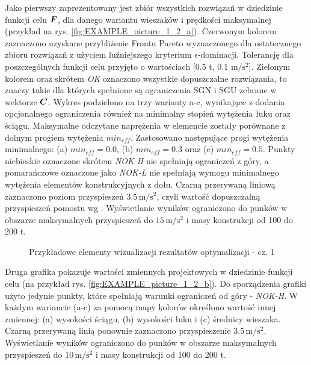 Jako pierwszy zaprezentowany jest zbiór wszystkich rozwiązań w dziedzinie funkcji celu $\bm{F}$, dla danego wariantu wieszaków i prędkości maksymalnej (przykład na rys. \ref{fig:EXAMPLE_picture_1_2_a}). Czerwonym kolorem zaznaczono uzyskane przybliżenie Frontu Pareto wyznaczonego dla ostatecznego zbioru rozwiązań z użyciem luźniejszego kryterium $\epsilon$-dominacji. Tolerancję dla poszczególnych funkcji celu przyjęto o wartościach [0.5 t, 0.1 $\mathrm{m/s^2}$]. Zielonym kolorem oraz skrótem \textit{OK} oznaczono wszystkie dopuszczalne rozwiązania, to znaczy takie dla których spełnione są ograniczenia SGN i SGU zebrane w wektorze $\bm{C}$.  Wykres podzielono na trzy warianty a-c, wynikające z dodania opcjonalnego ograniczenia również na minimalny stopień wytężenia łuku oraz ściągu. Maksymalne odczytane naprężenia w elemencie zostały porównane z dolnym progiem wytężenia $min_{eff}$. Zastosowano następujące progi wytężenia minimalnego: (a) $min_{eff}=0.0$, (b) $min_{eff}=0.3$ oraz (c) $min_{eff}=0.5$. Punkty niebieskie oznaczone skrótem \textit{NOK-H} nie spełniają ograniczeń z góry, a pomarańczowe oznaczone jako \textit{NOK-L} nie spełniają wymogu minimalnego wytężenia elementów konstrukcyjnych z dołu. Czarną przerywaną liniową zaznaczono poziom przyspieszeń $3.5\,\mathrm{m/s^2}$, czyli wartość dopuszczalną przyspieszeń pomostu wg \cite{PKNc}. Wyświetlanie wyników ograniczono do punków w obszarze maksymalnych przyspieszeń do  $15\,\mathrm{m/s^2}$ i masy konstrukcji od 100 do 200 t.

\begin{figure}[hbt!]
	\centering
	\captionsetup{justification=centering}
	\caption{Przykładowe elementy wizualizacji rezultatów optymalizacji - cz. 1}
	\label{fig:EXAMPLE_picture_1_2}
\end{figure}

Druga grafika pokazuje wartości zmiennych projektowych w dziedzinie funkcji celu (na przykład rys. \ref{fig:EXAMPLE_picture_1_2_b}). Do sporządzenia grafiki użyto jedynie punkty, które spełniają warunki ograniczeń od góry - \textit{NOK-H}. W każdym wariancie (a-c) za pomocą mapy kolorów określono wartość innej zmiennej: (a) wysokości ściągu, (b) wysokości łuku i (c) średnicy wieszaka. Czarną przerywaną linią ponownie zaznaczono przyspieszenie $3.5\,\mathrm{m/s^2}$. Wyświetlanie wyników ograniczono do punków w obszarze maksymalnych przyspieszeń do $10\,\mathrm{m/s^2}$ i masy konstrukcji od 100 do 200 t.

